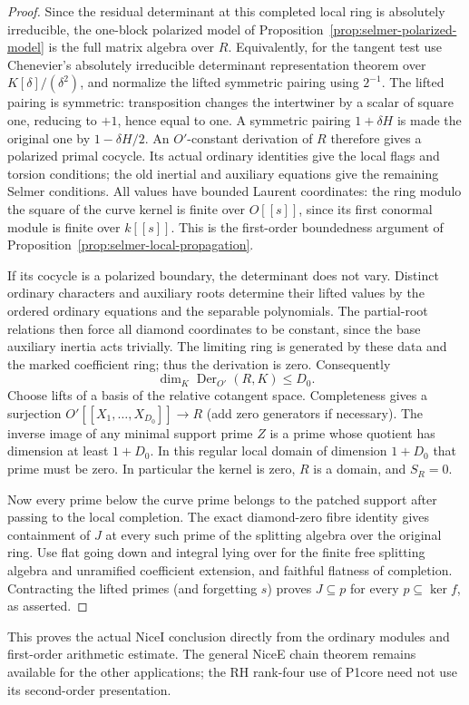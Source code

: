 \begin{proof}
Since the residual determinant at this completed local
ring is absolutely irreducible, the one-block polarized
model of Proposition~\ref{prop:selmer-polarized-model}
is the full matrix algebra over $R$. Equivalently,
for the tangent test use Chenevier's absolutely irreducible
determinant representation theorem over $K[\delta]/(\delta^2)$,
and normalize the lifted symmetric pairing using $2^{-1}$.
The lifted pairing is symmetric: transposition changes the
intertwiner by a scalar of square one, reducing to $+1$,
hence equal to one. A symmetric pairing $1+\delta H$ is
made the original one by $1-\delta H/2$.
An $O'$-constant derivation of $R$ therefore gives a
polarized primal cocycle. Its actual ordinary identities
give the local flags and torsion conditions; the old
inertial and auxiliary equations give the remaining
Selmer conditions. All values have bounded Laurent
coordinates: the ring modulo the square of the curve
kernel is finite over $O[[s]]$, since its first
conormal module is finite over $k[[s]]$. This is the
first-order boundedness argument of
Proposition~\ref{prop:selmer-local-propagation}.

If its cocycle is a polarized boundary, the determinant
does not vary. Distinct ordinary characters and auxiliary
roots determine their lifted values by the ordered
ordinary equations and the separable polynomials.
The partial-root relations then force all diamond
coordinates to be constant, since the base auxiliary
inertia acts trivially. The limiting ring is generated
by these data and the marked coefficient ring; thus the
derivation is zero. Consequently
\[
 \dim_K\operatorname{Der}_{O'}(R,K)\le D_0 .
\]
Choose lifts of a basis of the relative cotangent space.
Completeness gives a surjection
$O'[[X_1,\ldots,X_{D_0}]]\to R$ (add zero generators
if necessary). The inverse image of any minimal support
prime $Z$ is a prime whose quotient has dimension at
least $1+D_0$. In this regular local domain of dimension
$1+D_0$ that prime must be zero. In particular the
kernel is zero, $R$ is a domain, and $S_R=0$.

Now every prime below the curve prime belongs to the
patched support after passing to the local completion.
The exact diamond-zero fibre identity gives containment
of $J$ at every such prime of the splitting algebra
over the original ring. Use flat going down and integral
lying over for the finite free splitting algebra and
unramified coefficient extension, and faithful flatness
of completion. Contracting the lifted primes (and
forgetting $s$) proves $J\subseteq p$ for every
$p\subseteq\ker f$, as asserted.
\end{proof}

This proves the actual NiceI conclusion directly from the
ordinary modules and first-order arithmetic estimate. The
general NiceE chain theorem remains available for the
other applications; the RH rank-four use of P1core need
not use its second-order presentation.
